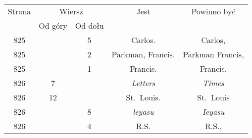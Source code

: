 \documentclass[a4paper,11pt]{article}
\numberwithin{equation}{section}
\begin{document}
\begin{center}
  \begin{tabular}{|c|c|c|c|c|}
    \hline
    Strona & \multicolumn{2}{c|}{Wiersz} & Jest
                              & Powinno być \\ \cline{2-3}
    & Od góry & Od dołu & & \\
    \hline
    825 & & \hphantom{0}5 & Carlos. & Carlos, \\
    825 & & \hphantom{0}2 & Parkman, Francis. & Parkman Francis, \\
    825 & & \hphantom{0}1 & Francis. & Francis, \\
    826 & \hphantom{0}7 & & \textit{Letters} & \textit{Times} \\
    826 & 12 & & St.~Louis. & St.~Louis \\
    826 & & \hphantom{0}8 & \textit{leyasu} & \textit{Ieyasu} \\
    826 & & \hphantom{0}4 & R.S. & R.S., \\
    \hline
  \end{tabular}

\end{center}
\end{document}
